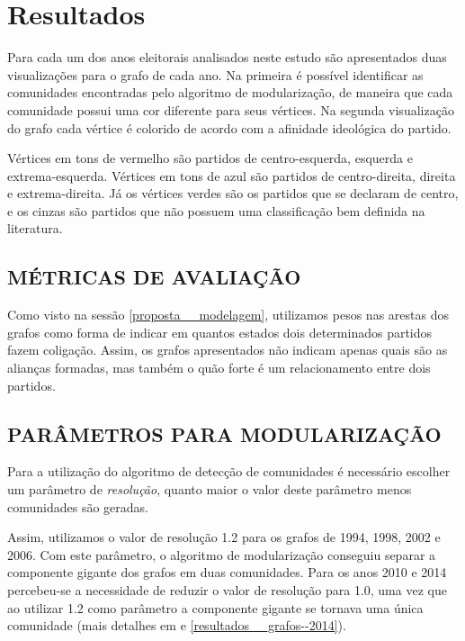 \chapter{Resultados}
\label{resultados}

Para cada um dos anos eleitorais analisados neste estudo são apresentados duas visualizações para o grafo de cada ano. Na primeira é possível identificar as comunidades encontradas pelo algoritmo de modularização, de maneira que cada comunidade possui uma cor diferente para seus vértices. Na segunda visualização do grafo cada vértice é colorido de acordo com a afinidade ideológica do partido.

Vértices em tons de vermelho são partidos de centro-esquerda, esquerda e extrema-esquerda. Vértices em tons de azul são partidos de centro-direita, direita e extrema-direita. Já os vértices verdes são os partidos que se declaram de centro, e os cinzas são partidos que não possuem uma classificação bem definida na literatura.

\section{\texorpdfstring{\MakeUppercase{Métricas de avaliação}}{}}
\label{resultados__metricas-avaliacao}

Como visto na sessão \ref{proposta__modelagem}, utilizamos pesos nas arestas dos grafos como forma de indicar em quantos estados dois determinados partidos fazem coligação. Assim, os grafos apresentados não indicam apenas quais são as alianças formadas, mas também o quão forte é um relacionamento entre dois partidos.

\section{\texorpdfstring{\MakeUppercase{Parâmetros para modularização}}{}}
\label{resultados__parametros-modularizacao}

Para a utilização do algoritmo de detecção de comunidades é necessário escolher um parâmetro de \emph{resolução}, quanto maior o valor deste parâmetro menos comunidades são geradas.

Assim, utilizamos o valor de resolução 1.2 para os grafos de 1994, 1998, 2002 e 2006. Com este parâmetro, o algoritmo de modularização conseguiu separar a componente gigante dos grafos em duas comunidades. Para os anos 2010 e 2014 percebeu-se a necessidade de reduzir o valor de resolução para 1.0, uma vez que ao utilizar 1.2 como parâmetro a componente gigante se tornava uma única comunidade (mais detalhes em  e \ref{resultados__grafos--2014}).

